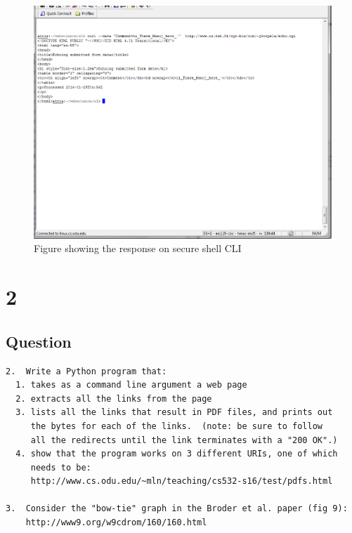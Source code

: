 \documentclass[letterpaper,11pt]{article}
\begin{document}
\begin{figure}
\includegraphics[scale=0.6]{shellresponse.png}
\caption{ Figure showing the response on secure shell CLI}
\label{fig:screen3}
\end{figure}




\newpage
\section*{2}

\subsection*{Question}





\begingroup
\fontsize{8pt}{10pt}\selectfont
\begin{verbatim}
2.  Write a Python program that:
  1. takes as a command line argument a web page
  2. extracts all the links from the page
  3. lists all the links that result in PDF files, and prints out
     the bytes for each of the links.  (note: be sure to follow
     all the redirects until the link terminates with a "200 OK".)
  4. show that the program works on 3 different URIs, one of which
     needs to be: 
     http://www.cs.odu.edu/~mln/teaching/cs532-s16/test/pdfs.html

3.  Consider the "bow-tie" graph in the Broder et al. paper (fig 9):
    http://www9.org/w9cdrom/160/160.html

\end{verbatim}
\endgroup
\end{document}
